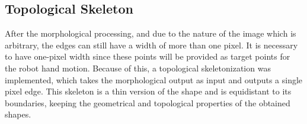 \documentclass[conference]{IEEEtran}
\begin{document}

\subsection{Topological Skeleton}

After the morphological processing, and due to the nature of the image which is arbitrary, the edges can still have a width of more than one pixel. It is necessary to have one-pixel width since these points will be provided as target points for the robot hand motion. Because of this, a topological skeletonization was implemented, which takes the morphological output as input and outputs a single pixel edge. This skeleton is a thin version of the shape and is equidistant to its boundaries, keeping the geometrical and topological properties of the obtained shapes.
\end{document}
